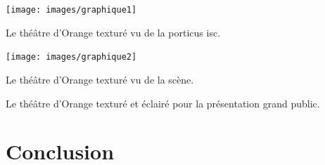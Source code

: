  \begin{figureth}
	\begin{subfigureth}{\textwidth}
		\texttt{[image: images/graphique1]}
	\caption{Le théâtre d'Orange texturé vu de la \gls{porticus isc}.} 
	\end{subfigureth}	
	\par\vspace{1cm}
	\begin{subfigureth}{\textwidth}
		\texttt{[image: images/graphique2]}
		\caption{Le théâtre d'Orange texturé vu de la scène.} 		
	\end{subfigureth}	
	\caption{Le théâtre d'Orange texturé et éclairé pour la présentation grand public.}
	\label{theatretexture}
\end{figureth}


		
		
\chapter*{Conclusion}

